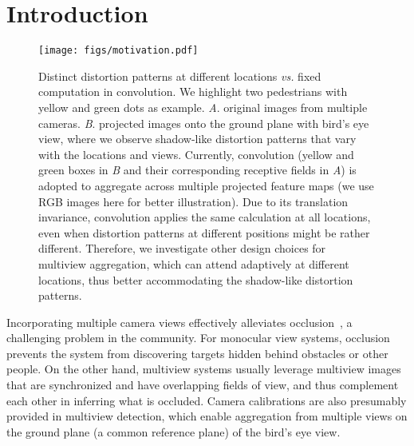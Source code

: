 \documentclass[sigconf,authorversion,nonacm]{acmart}
\begin{document}




\maketitle

\section{Introduction}



\begin{figure}[h]
  \centering
  \texttt{[image: figs/motivation.pdf]}
  \caption{
  Distinct distortion patterns at different locations \textit{vs.} fixed computation in convolution. 
  We highlight two pedestrians with \textcolor{myyellow}{yellow} and \textcolor{mygreen}{green} dots as example. 
  \textit{A}. original images from multiple cameras. \textit{B}. projected images onto the ground plane with bird's eye view, where we observe shadow-like distortion patterns that vary with the locations and views.
  Currently, convolution (\textcolor{myyellow}{yellow} and \textcolor{mygreen}{green}  boxes in \textit{B} and their corresponding receptive fields in \textit{A}) is adopted to aggregate across multiple projected feature maps (we use RGB images here for better illustration). Due to its translation invariance, convolution applies the same calculation at all locations, even when distortion patterns at different positions 
  might be rather different. 
  Therefore, we investigate other design choices for multiview aggregation, which can attend adaptively at different locations, thus better accommodating the shadow-like distortion patterns. 
}
  \label{fig:intro}
\end{figure}



Incorporating multiple camera views effectively alleviates occlusion~\cite{roig2011conditional,baque2017deep,hou2020multiview}, a challenging problem in the community. For monocular view systems, occlusion prevents the system from discovering targets hidden behind obstacles or other people. 
On the other hand, multiview systems usually leverage multiview images that are synchronized and have overlapping fields of view, and thus complement each other in inferring what is occluded. Camera calibrations are also presumably provided in multiview detection, which enable aggregation from multiple views on the ground plane (a common reference plane) of the bird's eye view. 
\end{document}
